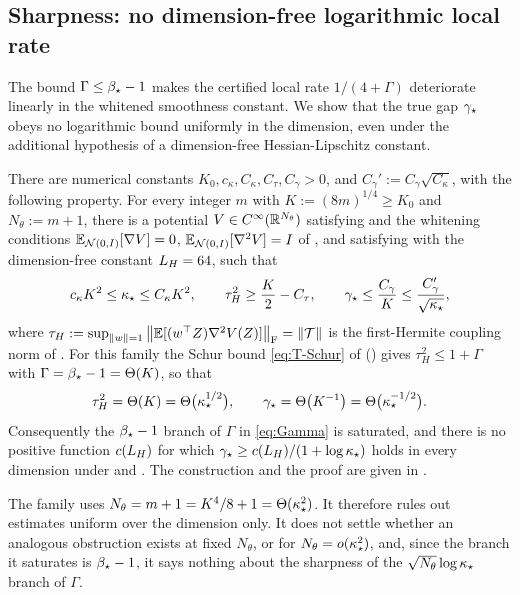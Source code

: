 \subsection{Sharpness: no dimension-free logarithmic local rate}
\label{subsec:loc-sharp}

The bound $\Gamma\leq\beta_\star-1$ makes the certified local rate $1/(4+\Gamma)$ deteriorate
linearly in the whitened smoothness constant. We show that the true gap $\gamma_\star$ obeys no logarithmic bound uniformly in the dimension, even
under the additional hypothesis of a dimension-free Hessian-Lipschitz constant.

\begin{theorem}
\label{thm:loc-sharp}
There are numerical constants $K_0,c_\kappa,C_\kappa,C_\tau,C_\gamma>0$, and
$C_\gamma':=C_\gamma\sqrt{C_\kappa}$, with the following property. For every
integer $m$ with $K:=(8m)^{1/4}\geq K_0$ and $N_\theta:=m+1$, there is a potential
$V\in C^\infty(\mathbb{R}^{N_\theta})$ satisfying  and the whitening
conditions $\mathbb{E}_{\mathcal{N}(0,I)}[\nabla V]=0$, $\mathbb{E}_{\mathcal{N}(0,I)}[\nabla^2V]=I$ of
, and satisfying  with the dimension-free constant
$L_H=64$, such that
\[
    c_\kappa K^2\leq\kappa_\star\leq C_\kappa K^2,
    \qquad
    \tau_H^2\geq\frac K2-C_\tau,
    \qquad
    \gamma_\star\leq\frac{C_\gamma}K\leq\frac{C_\gamma'}{\sqrt{\kappa_\star}},
\]
where $\tau_H:=\sup_{\left\lVert w\right\rVert=1}\left\lVert \mathbb{E}[(w^\top Z)\nabla^2V(Z)]\right\rVert_{\mathrm{F}}=\left\lVert \mathcal T\right\rVert$ is
the first-Hermite coupling norm of . For this family the Schur bound
\eqref{eq:T-Schur} of  () gives $\tau_H^2\leq1+\Gamma$ with $\Gamma=\beta_\star-1=\Theta(K)$, so that
\[
    \tau_H^2=\Theta(K)=\Theta\bigl(\kappa_\star^{1/2}\bigr),
    \qquad
    \gamma_\star=\Theta\bigl(K^{-1}\bigr)=\Theta\bigl(\kappa_\star^{-1/2}\bigr).
\]
Consequently the $\beta_\star-1$ branch of $\Gamma$ in \eqref{eq:Gamma} is saturated, and there
is no positive function $c(L_H)$ for which $\gamma_\star\geq c(L_H)/(1+\log\kappa_\star)$ holds in
every dimension under  and . The
construction and the proof are given in .
\end{theorem}

The family uses $N_\theta=m+1=K^4/8+1=\Theta(\kappa_\star^2)$. It therefore rules out estimates
uniform over the dimension only. It does not settle whether an analogous obstruction exists at
fixed $N_\theta$, or for $N_\theta=o(\kappa_\star^2)$, and, since the branch it saturates is
$\beta_\star-1$, it says nothing about the sharpness of the $\sqrt{N_\theta}\log\kappa_\star$
branch of $\Gamma$.

